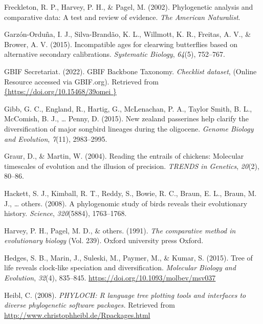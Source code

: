 \documentclass[english,man]{apa6}
\begin{document}
\leavevmode\hypertarget{ref-freckleton2002phylogenetic}{}%
Freckleton, R. P., Harvey, P. H., \& Pagel, M. (2002). Phylogenetic analysis and comparative data: A test and review of evidence. \emph{The American Naturalist}.

\leavevmode\hypertarget{ref-garzon2015incompatible}{}%
Garzón-Orduña, I. J., Silva-Brandão, K. L., Willmott, K. R., Freitas, A. V., \& Brower, A. V. (2015). Incompatible ages for clearwing butterflies based on alternative secondary calibrations. \emph{Systematic Biology}, \emph{64}(5), 752--767.

\leavevmode\hypertarget{ref-gbif2022taxonomy}{}%
GBIF Secretariat. (2022). GBIF Backbone Taxonomy. \emph{Checklist dataset}, (Online Resource accessed via GBIF.org). Retrieved from \href{\%7Bhttps://doi.org/10.15468/39omei\%20\%7D}{\{https://doi.org/10.15468/39omei \}}

\leavevmode\hypertarget{ref-gibb2015new}{}%
Gibb, G. C., England, R., Hartig, G., McLenachan, P. A., Taylor Smith, B. L., McComish, B. J., \ldots{} Penny, D. (2015). New zealand passerines help clarify the diversification of major songbird lineages during the oligocene. \emph{Genome Biology and Evolution}, \emph{7}(11), 2983--2995.

\leavevmode\hypertarget{ref-graur2004reading}{}%
Graur, D., \& Martin, W. (2004). Reading the entrails of chickens: Molecular timescales of evolution and the illusion of precision. \emph{TRENDS in Genetics}, \emph{20}(2), 80--86.

\leavevmode\hypertarget{ref-hackett2008phylogenomic}{}%
Hackett, S. J., Kimball, R. T., Reddy, S., Bowie, R. C., Braun, E. L., Braun, M. J., \ldots{} others. (2008). A phylogenomic study of birds reveals their evolutionary history. \emph{Science}, \emph{320}(5884), 1763--1768.

\leavevmode\hypertarget{ref-harvey1991comparative}{}%
Harvey, P. H., Pagel, M. D., \& others. (1991). \emph{The comparative method in evolutionary biology} (Vol. 239). Oxford university press Oxford.

\leavevmode\hypertarget{ref-Hedges2015}{}%
Hedges, S. B., Marin, J., Suleski, M., Paymer, M., \& Kumar, S. (2015). Tree of life reveals clock-like speciation and diversification. \emph{Molecular Biology and Evolution}, \emph{32}(4), 835--845. \url{https://doi.org/10.1093/molbev/msv037}

\leavevmode\hypertarget{ref-Heibl2008}{}%
Heibl, C. (2008). \emph{PHYLOCH: R language tree plotting tools and interfaces to diverse phylogenetic software packages.} Retrieved from \url{http://www.christophheibl.de/Rpackages.html}
\end{document}
